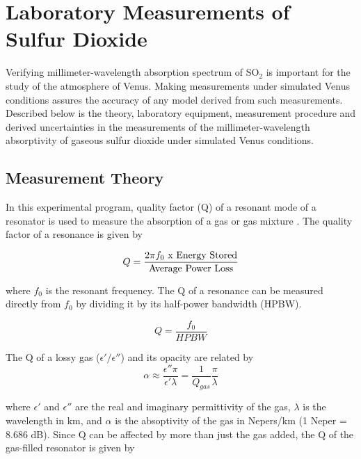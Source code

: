 \section{Laboratory Measurements of Sulfur Dioxide}

Verifying millimeter-wavelength absorption spectrum of SO$_2$ is important for the study of the atmosphere of Venus. Making measurements under simulated Venus conditions assures the accuracy of any model derived from such measurements.
 Described below is the theory, laboratory equipment, measurement procedure and derived uncertainties in the measurements of the millimeter-wavelength absorptivity of gaseous sulfur dioxide under simulated Venus conditions.

\subsection{Measurement Theory}

In this experimental program, quality factor (Q) of a resonant mode of a resonator is used to measure the absorption of a gas or gas mixture \cite{high-sensitivity}. The quality factor of a resonance is given by \cite{matching}

\begin{equation} \label{eq:qlong}
Q = \frac{2\pi f_0 \textnormal{ x Energy Stored}}{\textnormal{Average Power Loss}}
\end{equation}

\noindent where $f_0$ is the resonant frequency. The Q of a resonance can be measured directly from $f_0$ by dividing it by its half-power bandwidth (HPBW).

\begin{equation} \label{eq:qshort}
Q = \frac{f_0}{HPBW}
\end{equation}

\noindent The Q of a lossy gas ($\epsilon'/\epsilon''$) and its opacity are related by
\begin{equation} \label{eq:alphaapprox}
\alpha \approx \frac{\epsilon'' \pi}{\epsilon' \lambda} = \frac{1}{Q_{gas}} \frac{\pi}{\lambda}
\end{equation}

\noindent where $\epsilon'$ and $\epsilon''$ are the real and imaginary permittivity of the gas, $\lambda$ is the wavelength in km, and $\alpha$ is the absoptivity of the gas in Nepers/km (1 Neper = 8.686 dB). Since Q can be affected by more than just the gas added, the Q of the gas-filled resonator is given by

